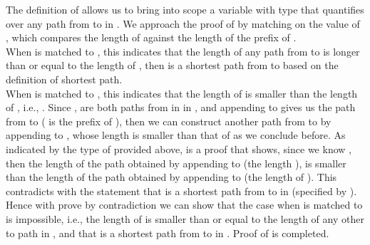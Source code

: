 The definition of  allows us to bring into scope a variable  with type  that quantifies over any path from  to  in . We approach the proof of  by matching on the value of , which compares the length of  against the length of the prefix  of . 
\\

When  is matched to , this indicates that the length of any path from  to  is longer than or equal to the length of , then  is a shortest path from  to  based on the definition of shortest path. 
\\

When  is matched to , this indicates that the length of  is smaller than the length of , i.e., . Since ,  are both paths from  in  in , and appending  to  gives us the path  from  to  ( is the prefix of ), then we can construct another path  from  to  by appending  to , whose length is smaller than that of  as we conclude  before. As indicated by the type of  provided above,  is a proof that shows, since we know , then the length of the path obtained by appending  to  (the length ), is smaller than the length of the path obtained by appending  to  (the length of ). This contradicts with the statement that  is a shortest path from  to  in (specified by ). Hence with prove by contradiction we can show that the case when  is matched to  is impossible, i.e., the length of  is smaller than or equal to the length of any other  to  path in , and that  is a shortest path from  to  in . Proof of  is completed. 
\\